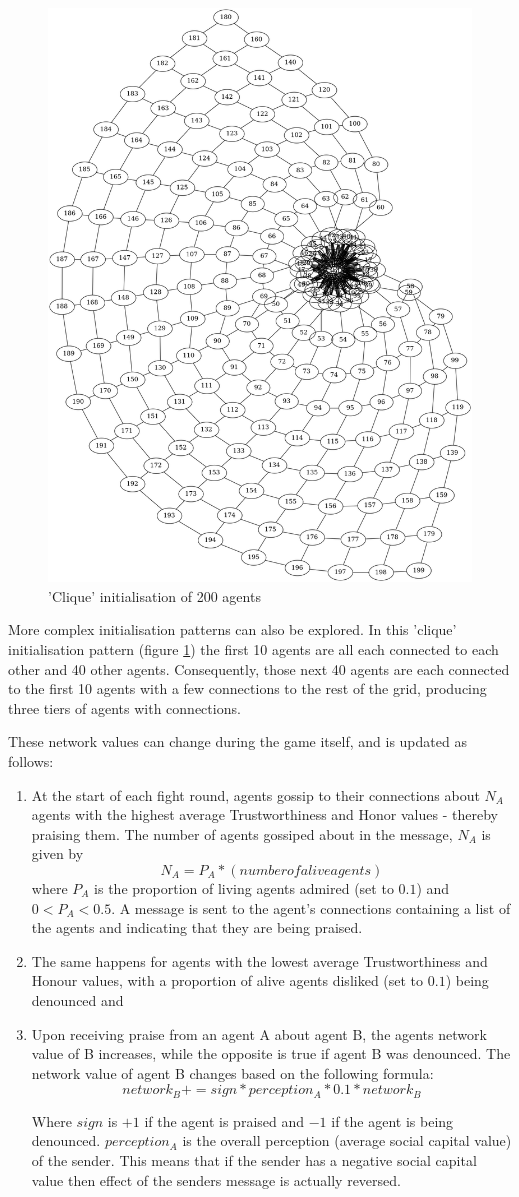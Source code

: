 \begin{figure}[!h]
    \centering
    \includegraphics[width=0.4\linewidth]{004_team_1_agent_design/images/sc_network_clique.png}
    \caption{'Clique' initialisation of 200 agents}
    \label{fig:sc_network_clique}
\end{figure}

More complex initialisation patterns can also be explored. In this 'clique' initialisation pattern (figure \ref{fig:sc_network_clique}) the first 10 agents are all each connected to each other and 40 other agents. Consequently, those next 40 agents are each connected to the first 10 agents with a few connections to the rest of the grid, producing three tiers of agents with connections.

These network values can change during the game itself, and is updated as follows:
\begin{enumerate}
    \item At the start of each fight round, agents gossip to their connections about $N_A$ agents with the highest average Trustworthiness and Honor values - thereby praising them. The number of agents gossiped about in the message, $N_A$ is given by 
    \[
    N_A = P_A * (number of alive agents)
    \]
    where $P_A$ is the proportion of living agents admired (set to $0.1$) and $0 < P_A < 0.5$. A message is sent to the agent's connections containing a list of the agents and indicating that they are being praised.
    \item The same happens for agents with the lowest average Trustworthiness and Honour values, with a proportion of alive agents disliked (set to $0.1$) being denounced and 
    \item Upon receiving praise from an agent A about agent B, the agents network value of B increases, while the opposite is true if agent B was denounced. The network value of agent B changes based on the following formula:
    \[
    network_B += sign * perception_A * 0.1 * network_B
    \]
    
    Where $sign$ is $+1$ if the agent is praised and $-1$ if the agent is being denounced. $perception_A$ is the overall perception (average social capital value) of the sender. This means that if the sender has a negative social capital value then effect of the senders message is actually reversed.
\end{enumerate}

